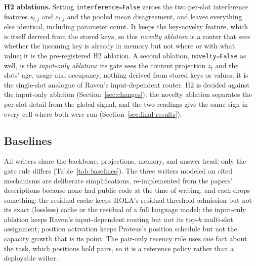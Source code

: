 \documentclass[conference]{IEEEtran}
\begin{document}
\textbf{H2 ablations.} Setting \texttt{interference=False} zeroes the two
per-slot interference features $s_{t,j}$ and $e_{t,j}$ and the pooled mean
disagreement, and leaves everything else identical, including parameter count.
It keeps the key-novelty feature, which is itself derived from the stored
keys, so this \emph{novelty ablation} is a router that sees whether the
incoming key is already in memory but not where or with what value; it is the
pre-registered H2 ablation. A second ablation, \texttt{novelty=False} as well,
is the \emph{input-only ablation}: its gate sees the content projection $z_t$
and the slots' age, usage and occupancy, nothing derived from stored keys or
values; it is the single-slot analogue of Raven's input-dependent router. H2
is decided against the input-only ablation (Section~\ref{sec:changes}); the
novelty ablation separates the per-slot detail from the global signal, and the
two readings give the same sign in every cell where both were run
(Section~\ref{sec:final-results}).

\subsection{Baselines}
\label{sec:baselines}

All writers share the backbone, projections, memory, and answer head; only the
gate rule differs (Table~\ref{tab:baselines}). The three writers modeled on
cited mechanisms are deliberate simplifications, re-implemented from the
papers' descriptions because none had public code at the time of writing, and
each drops something: the residual cache keeps HOLA's residual-threshold
admission but not its exact (lossless) cache or the residual of a full language
model; the input-only ablation keeps Raven's input-dependent routing but not
its top-$k$ multi-slot assignment; position activation keeps Proteus's position
schedule but not the capacity growth that is its point. The pair-only recency
rule uses one fact about the task, which positions hold pairs, so it is a
reference policy rather than a deployable writer.
\end{document}

